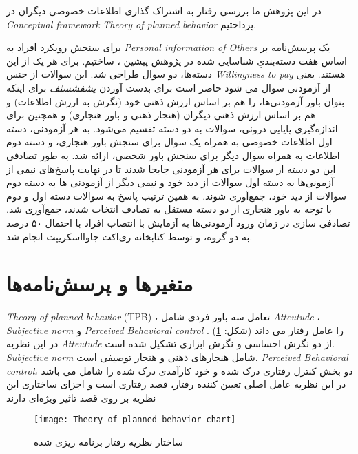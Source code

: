 در این پژوهش ما بررسی رفتار به اشتراک گذاری اطلاعات خصوصی دیگران در
\textit{
  \gls{Conceptual framework}
}
\textit{
  \gls{Theory of planned behavior}
}
پرداختیم.

برای سنجش رویکرد‍ افراد به
\textit{
  \gls{Personal information of Others}
}
یک پرسش‌نامه بر اساس هفت دسته‌بندی‌ِ شناسایی شده در پژوهش پیشین
\!\citep{karwatzkiMultidimensionalNaturePrivacy2022}،
 ساختیم.
 برای هر یک از این دسته‌ها، دو سوال طراحی شد.
 این سوالات از جنس 
 \textit{
  \gls{Willingness to pay}
 }
 هستند. یعنی از آزمودنی سوال می شود حاضر است برای بدست آوردن 
 \textit{
  \gls{يشفشسثف}
 }
 برای اینکه بتوان باور
آزمودنی‌ها، را هم بر اساس ارزش ذهنی خود
\!(نگرش به ارزش اطلاعات)
و هم بر اساس ارزش ذهنی دیگران
\!(هنجار ذهنی و باور هنجاری)
و همچنین برای اندازه‌گیری پایایی درونی،
سوالات به دو دسته تقسیم ‌می‌شود.
به هر آزمودنی، دسته اول اطلاعات خصوصی به همراه یک سوال برای سنجش باور هنجاری، و دسته دوم
اطلاعات به همراه سوال دیگر برای سنجش باور شخصی، ارائه شد. به طور تصادفی این دو دسته از
سوالات برای هر آزمودنی جابجا شدند تا در نهایت پاسخ‌های نیمی از آزمونی‌ها به دسته اول سوالات از دید خود و نیمی
دیگر از آزمودنی ها به دسته دوم سوالات از دید خود، جمع‌آوری شوند. به همین ترتیب پاسخ به سوالات دسته اول و دوم
با توجه به باور هنجاری از دو دسته مستقل به تصادف انتخاب شدند، جمع‌آوری شد. تصادفی سازی در زمان ورود آزمودنی‌ها
به آزمایش با انتصاب افراد با احتمال ۵۰ درصد به دو گروه، و توسط کتابخانه ری‌اکت جاوااسکریپت انجام شد.

\section{متغیر‌ها و پرسش‌نامه‌ها}

\ifPlennedBahaviorTheory
  \textit{\gls{Theory of planned behavior}}
  \!(TPB)
  ، تعامل سه باور فردی شامل
  \textit{\gls{Atteutude}} ،
  \textit{\gls{Subjective norm}} و
  \textit{\gls{Perceived Behavioral control}}
  را عامل رفتار می داند
  \!(شکل: \ref{fig:Theory_of_planned_behavior_chart})
  \!\citep{ajzenTheoryPlannedBehavior2020}.
  در این نظریه
  \textit{\gls{Atteutude}}
  از دو نگرش احساسی و نگرش ابزاری تشکیل شده است.
  \textit{\gls{Subjective norm}}
  شامل  هنجارهای ذهنی و هنجار توصیفی است.
  \textit{\gls{Perceived Behavioral control}}،
  دو بخش کنترل رفتاری درک شده و خود کارآمدی درک شده را شامل می باشد
  در این نظریه عامل اصلی تعیین کننده
  رفتار، قصد رفتاری است و اجزای ساختاری این نظریه
  بر روی قصد تاثیر ویژه‌ای دارند
  \citep{mhmdpwrBrrsyTthyrTywry2022}
  \begin{figure}[ht]
    \centerline{\texttt{[image: Theory\_of\_planned\_behavior\_chart]}}
    \caption{ساختار نظریه رفتار برنامه ریزی شده
    }
    \label{fig:Theory_of_planned_behavior_chart}
  \end{figure}\\

